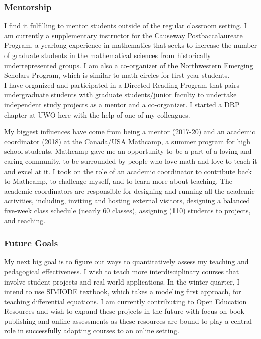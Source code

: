 \documentclass[
]{report}
\begin{document}
\hypertarget{mentorship}{%
\subsubsection*{Mentorship}\label{mentorship}}


I find it fulfilling to mentor students outside of the regular classroom setting.
I am currently a supplementary instructor for the Causeway Postbaccalaureate Program, a yearlong experience in mathematics that seeks to increase the number of graduate students in the mathematical sciences from historically underrepresented groups.
I am also a co-organizer of the Northwestern Emerging Scholars Program, which is similar to math circles for first-year students.\\
I have organized and participated in a Directed Reading Program that pairs undergraduate students with graduate students/junior faculty to undertake independent study projects as a mentor and a co-organizer.
I started a DRP chapter at UWO here with the help of one of my colleagues.

My biggest influences have come from being a mentor (2017-20) and an academic coordinator
(2018) at the Canada/USA Mathcamp, a summer program for high school students.
Mathcamp gave me an opportunity to be a part of a loving and caring community, to be surrounded by people who love math and love to teach it and excel at it.
I took on the role of an academic coordinator to contribute back to Mathcamp, to challenge myself, and to learn more about teaching.
The academic coordinators are responsible for designing and running all the academic activities, including, inviting and hosting external visitors, designing a balanced five-week class schedule (nearly 60 classes), assigning (110) students to projects, and teaching.

\hypertarget{future-goals}{%
\subsubsection*{Future Goals}\label{future-goals}}


My next big goal is to figure out ways to quantitatively assess my teaching and pedagogical effectiveness.
I wish to teach more interdisciplinary courses that involve student projects and real world applications.
In the winter quarter, I intend to use SIMIODE textbook, which takes a modeling first approach, for teaching differential equations.
I am currently contributing to Open Education Resources and wish to expand these projects in the future with focus on book publishing and online assessments as these resources are bound to play a central role in successfully adapting courses to an online setting.
\end{document}
